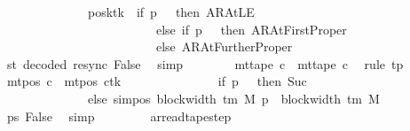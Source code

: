 \begin{isabellebody}
\ \ \ \ \ \ \ \ \ \ \ \ \ \ posk{\isacharparenleft}{\kern0pt}tk\ {\isacharcolon}{\kern0pt}{\isacharequal}{\kern0pt}\ if\ p\ {\isacharequal}{\kern0pt}\ {}\ then\ AR{\isacharunderscore}{\kern0pt}AtLE\isanewline
\ \ \ \ \ \ \ \ \ \ \ \ \ \ \ \ \ \ \ \ \ \ \ \ \ else\ if\ p\ {\isacharequal}{\kern0pt}\ {}\ then\ AR{\isacharunderscore}{\kern0pt}AtFirstProper\isanewline
\ \ \ \ \ \ \ \ \ \ \ \ \ \ \ \ \ \ \ \ \ \ \ \ \ else\ AR{\isacharunderscore}{\kern0pt}AtFurtherProper{\isacharparenright}{\kern0pt}{\isacharparenright}{\kern0pt}{\isachardoublequoteclose}\isanewline
\ \ \ \ \ \ \ \ \isamarkupfalse%
\ st\ decoded\ resync\ False\ \isamarkupfalse%
\ simp\isanewline
\ \ \ \ \ \ \isamarkupfalse%
\ {\isachardoublequoteopen}mt{\isacharunderscore}{\kern0pt}tape\ c{\isacharprime}{\kern0pt}{\isacharprime}{\kern0pt}\ {\isacharequal}{\kern0pt}\ mt{\isacharunderscore}{\kern0pt}tape\ c{\isacharprime}{\kern0pt}{\isachardoublequoteclose}\ \isamarkupfalse%
\ {\isacharparenleft}{\kern0pt}rule\ tp{\isacharparenright}{\kern0pt}\isanewline
\ \ \ \ \ \ \isamarkupfalse%
\ {\isachardoublequoteopen}mt{\isacharunderscore}{\kern0pt}pos\ c{\isacharprime}{\kern0pt}{\isacharprime}{\kern0pt}\ {\isacharequal}{\kern0pt}\ {\isacharparenleft}{\kern0pt}mt{\isacharunderscore}{\kern0pt}pos\ c{\isacharprime}{\kern0pt}{\isacharparenright}{\kern0pt}{\isacharparenleft}{\kern0pt}tk\ {\isacharcolon}{\kern0pt}{\isacharequal}{\kern0pt}\isanewline
\ \ \ \ \ \ \ \ \ \ \ \ \ \ if\ p\ {\isacharequal}{\kern0pt}\ {}\ then\ Suc\ {}\isanewline
\ \ \ \ \ \ \ \ \ \ \ \ \ \ else\ sim{\isacharunderscore}{\kern0pt}pos\ {\isacharparenleft}{\kern0pt}block{\isacharunderscore}{\kern0pt}width\ {\isacharparenleft}{\kern0pt}{\isasymGamma}{\isacharunderscore}{\kern0pt}tm\ M{\isacharparenright}{\kern0pt}{\isacharparenright}{\kern0pt}\ p\ {\isacharplus}{\kern0pt}\ block{\isacharunderscore}{\kern0pt}width\ {\isacharparenleft}{\kern0pt}{\isasymGamma}{\isacharunderscore}{\kern0pt}tm\ M{\isacharparenright}{\kern0pt}{\isacharparenright}{\kern0pt}{\isachardoublequoteclose}\isanewline
\ \ \ \ \ \ \ \ \isamarkupfalse%
\ ps\ False\ \isamarkupfalse%
\ simp\isanewline
\ \ \ \ \isamarkupfalse%
\isanewline
\ \ \isamarkupfalse%
\isanewline
{}\isamarkupfalse%
%
\endisatagproof
{\isafoldproof}%
%
\isadelimproof
\isanewline
%
\endisadelimproof
\isanewline
{}\isamarkupfalse%
\ ar{\isacharunderscore}{\kern0pt}read{\isacharunderscore}{\kern0pt}tape{\isacharunderscore}{\kern0pt}step{\isacharcolon}{\kern0pt}\isanewline

\end{isabellebody}
